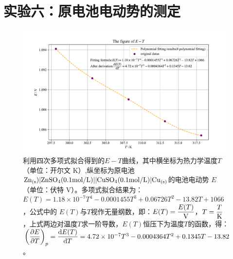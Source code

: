 \documentclass[UTF8,AutoFakeBold,a4paper]{article}
\begin{document}
	\section{}
	\section{}
	\section{}
	\section{}
	
	\section{实验六：原电池电动势的测定}
	\begin{figure}[h]
	\centering
	\includegraphics[scale=0.63]{6}
	\caption{利用四次多项式拟合得到的$E-T$曲线，其中横坐标为热力学温度$T$（单位：开尔文 K）,纵坐标为原电池$\ce{Zn}_{(\rm{s}})|\ce{ZnSO4}(0.1\rm{mol}/L)||\ce{CuSO4}(0.1\rm{mol/L})|\ce{Cu}_{(\rm{s})}$的电池电动势 $E$（单位：伏特 V）。多项式拟合结果为：\textcolor[rgb]{0.54,0.13,0.33}{$E(T) =1.18\times 10^{-7} T^{4} - 0.0001455 T^{3} + 0.06726 T^{2} - 13.82 T + 1066$}，公式中的 $E(T)$与$T$视作无量纲数，即：$E(T) = \dfrac{E(T)}{\ce{V}}$，$T = \dfrac{T}{\ce{K}}$，上式两边对温度$T$求一阶导数，$E(T)$恒压下为温度$T$的函数，得：\textcolor[rgb]{0.54,0.13,0.33}{$\pqty{\dfrac{\partial E}{\partial T}}_{p} = \dfrac{{\rm{d}}E(T)}{{\rm{d}}T} = 4.72\times 10^{-7} T^{3} - 0.0004364 T^{2} + 0.1345 T - 13.82$}。}
	\label{fi1}
\end{figure}
\newpage
\end{document}
